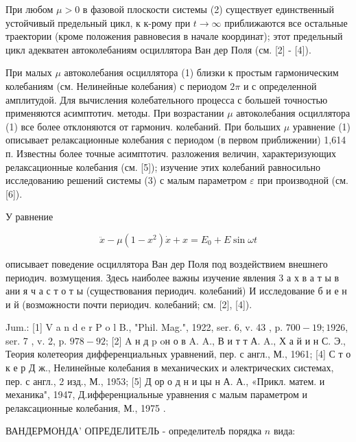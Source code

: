 \documentclass[10pt]{article}
\begin{document}
При любом $\mu>0$ в фазовой плоскости системы (2) существует единственный устойчивый предельный цикл, к к-рому при $t \rightarrow \infty$ приближаются все остальные траектории (кроме положения равновесия в начале координат); этот предельный цикл адекватен автоколебаниям осциллятора Ван дер Поля (см. [2] - [4]).



При малых $\mu$ автоколебания осциллятора (1) близки к простым гармоническим колебаниям (см. Нелинейные колебания) с периодом $2 \pi$ и с определенной амплитудой. Для вычисления колебательного процесса с большей точностью применяются асимптотич. методы. При возрастании $\mu$ автоколебания осциллятора (1) все более отклоняются от гармонич. колебаний. При больших $\mu$ уравнение (1) описывает релаксационные колебания с периодом (в первом приближении) 1,614 п. Известны более точные асимптотич. разложения величин, характеризующих релаксационные колебания (см. [5]); изучение этих колебаний равносильно исследованию решений системы (3) с малым параметром $\varepsilon$ при производной (см. [6]).



У равнение



\[

\ddot{x}-\mu\left(1-x^{2}\right) \dot{x}+x=E_{0}+E \sin \omega t

\]



описывает поведение осциллятора Ван дер Поля под воздействием внешнего периодич. возмущения. Здесь наиболее важны изучение явления 3 а х в а т ы в ани я ч а с т о т ы (существования периодич. колебаний) И исследование б и е н и й (возможности почти периодич. колебаний; см. [2], [4]).



Jum.: [1] V a n d e r P o l B., "Phil. Mag.", 1922, ser. 6, v. 43 , p. $700-19 ; 1926$, ser. 7 , v. 2, p. $978-92$; [2] A н д p oн о в A. A., В и т т А. A., Х а й и н С. Э., Теория колетеория дифференциальных уравнений, пер. с англ., М., 1961; [4] С т о к е р Д ж., Нелинейные колебания в механических и әлектрических системах, пер. с англ., 2 изд., М., 1953; [5] Д ор о д н и цы н А. А., «Прикл. матем. и механика", 1947, Д.ифференциальные уравнения с малым параметром и релаксационные колебания, М., 1975 .



ВАНДЕРМОНДА' ОПРЕДЕЛИТЕЛЬ - определителЬ порядка $n$ вида:
\end{document}
